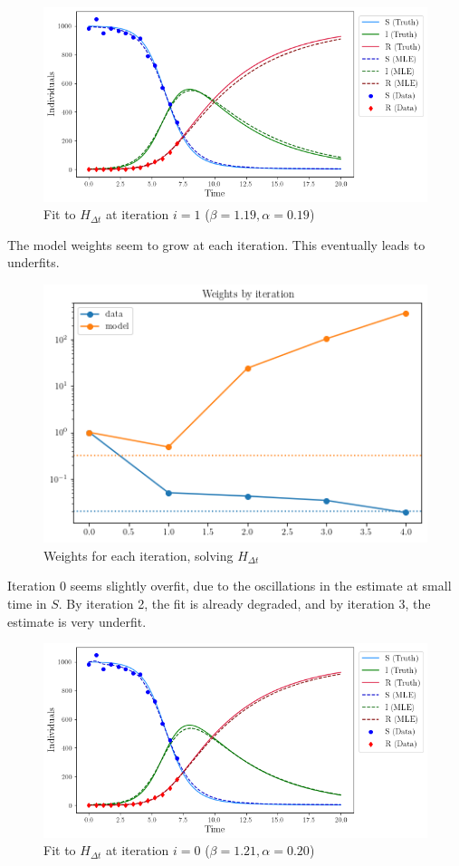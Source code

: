 \begin{figure}
\centering
\includegraphics{img/dtvariant_fit_iter1.png}
\caption{Fit to \(H_{\Delta t}\) at iteration \(i=1\)
(\(\beta=1.19, \alpha=0.19\))}
\end{figure}

The model weights seem to grow at each iteration. This eventually leads
to underfits.

\begin{figure}
\centering
\includegraphics{img/dtvariant_weights.png}
\caption{Weights for each iteration, solving \(H_{\Delta t}\)}
\end{figure}

Iteration 0 seems slightly overfit, due to the oscillations in the
estimate at small time in \(S\). By iteration 2, the fit is already
degraded, and by iteration 3, the estimate is very underfit.

\begin{figure}
\centering
\includegraphics{img/dtvariant_fit_iter0.png}
\caption{Fit to \(H_{\Delta t}\) at iteration \(i=0\)
(\(\beta=1.21, \alpha=0.20\))}
\end{figure}

